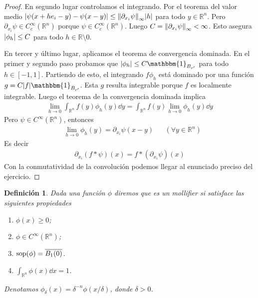 \documentclass{article}
\newcommand{\characteristic}{\mathbbm{1}}
\newcommand{\realNumbers}{\mathbb{R}}
\newtheorem{definition}{Definición}
\DeclareMathOperator{\support}{\textnormal{sop}}
\theoremstyle{remark}
\begin{document}
\begin{proof}
    En segundo lugar controlamos el integrando.
    Por el teorema del valor medio
    \(
      \abs{\psi(x + h e_i - y) - \psi(x - y)}
      \leq
      \norm{\partial_{x_i} \psi}_{\infty} \abs{h}
    \)
    para todo \(y \in \realNumbers^n\).
    Pero \(\partial_{x_i} \psi \in C^{\infty}_c(\realNumbers^n)\) porque \(\psi \in C^{\infty}_c(\realNumbers^n)\).
    Luego \(C = \norm{\partial_{x_i} \psi}_{\infty} < \infty\).
    Esto asegura \(\abs{\phi_h} \leq C\) para todo \(h \in \realNumbers \setminus 0\).
    
    En tercer y último lugar, aplicamos el teorema de convergencia dominada.
    En el primer y segundo paso probamos que \(\abs{\phi_h} \leq C \characteristic_{B_{r'}}\) para todo \(h \in [- 1, 1]\).
    Partiendo de esto, el integrando \(f \phi_h\) está dominado por una función \(g = C \abs{f} \characteristic_{B_{r'}}\).
    Esta \(g\) resulta integrable porque \(f\) es localmente integrable.
    Luego el teorema de la convergencia dominada implica
    \begin{align}
      \lim_{h \rightarrow 0}
        \int_{\realNumbers^n} f(y) \phi_h(y) \dd y
      =
      \int_{\realNumbers^n}
        f(y)
        \lim_{h \rightarrow 0} \phi_h(y) \dd y
    \end{align}
    Pero \(\psi \in C^{\infty}(\realNumbers^n)\), entonces
    \begin{align}
      &\lim_{h \rightarrow 0} \phi_h(y) = \partial_{x_i} \psi (x - y)
      && (\forall y \in \realNumbers^n)
    \end{align}
    Es decir
    \begin{align}
      \partial_{x_i} (f * \psi) (x)
      =
      f * (\partial_{x_i} \psi) (x)
    \end{align}
    Con la conmutatividad de la convolución podemos llegar al enunciado preciso del ejercicio.
  \end{proof}

  \begin{definition}
    Dada una función \(\phi\) diremos que es un mollifier si satisface las siguientes propiedades
    \begin{enumerate}[label=\alph*)]
      \item \(\phi(x) \geq 0\);
      \item \(\phi \in C^{\infty}(\realNumbers^n)\);
      \item \(\support(\phi) = \overline{B_1(0)}\).
      \item \(\int_{\realNumbers^n} \phi(x) \dd x = 1\).
    \end{enumerate}
    Denotamos \(\phi_{\delta}(x) = \delta^{- n} \phi(x / \delta)\), donde \(\delta > 0\).
  \end{definition}
\end{document}
